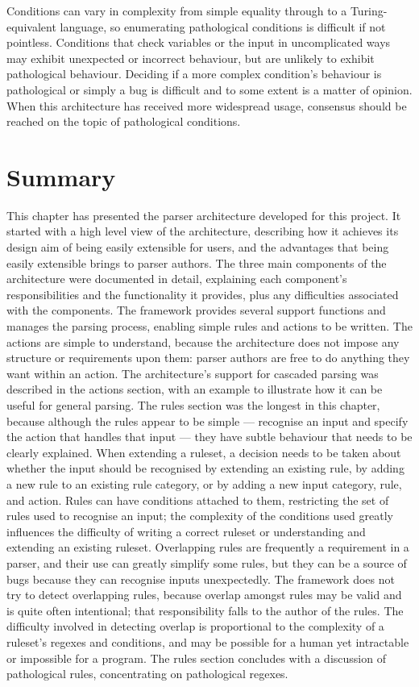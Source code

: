 Conditions can vary in complexity from simple equality through to a
Turing-equivalent language, so enumerating pathological conditions is
difficult if not pointless.  Conditions that check variables or the input
in uncomplicated ways may exhibit unexpected or incorrect behaviour, but
are unlikely to exhibit pathological behaviour.  Deciding if a more complex
condition's behaviour is pathological or simply a bug is difficult and to
some extent is a matter of opinion.  When this architecture has received
more widespread usage, consensus should be reached on the topic of
pathological conditions.

\section{Summary}

This chapter has presented the parser architecture developed for this
project.  It started with a high level view of the architecture, describing
how it achieves its design aim of being easily extensible for users, and
the advantages that being easily extensible brings to parser authors.  The
three main components of the architecture were documented in detail,
explaining each component's responsibilities and the functionality it
provides, plus any difficulties associated with the components.  The
framework provides several support functions and manages the parsing
process, enabling simple rules and actions to be written.  The actions are
simple to understand, because the architecture does not impose any
structure or requirements upon them: parser authors are free to do anything
they want within an action.  The architecture's support for cascaded
parsing was described in the actions section, with an example to illustrate
how it can be useful for general parsing.  The rules section was the
longest in this chapter, because although the rules appear to be simple ---
recognise an input and specify the action that handles that input --- they
have subtle behaviour that needs to be clearly explained.  When extending a
ruleset, a decision needs to be taken about whether the input should be
recognised by extending an existing rule, by adding a new rule to an
existing rule category, or by adding a new input category, rule, and
action.  Rules can have conditions attached to them, restricting the set of
rules used to recognise an input; the complexity of the conditions used
greatly influences the difficulty of writing a correct ruleset or
understanding and extending an existing ruleset.  Overlapping rules are
frequently a requirement in a parser, and their use can greatly simplify
some rules, but they can be a source of bugs because they can recognise
inputs unexpectedly.  The framework does not try to detect overlapping
rules, because overlap amongst rules may be valid and is quite often
intentional; that responsibility falls to the author of the rules.  The
difficulty involved in detecting overlap is proportional to the complexity
of a ruleset's regexes and conditions, and may be possible for a human yet
intractable or impossible for a program.  The rules section concludes with
a discussion of pathological rules, concentrating on pathological regexes.

